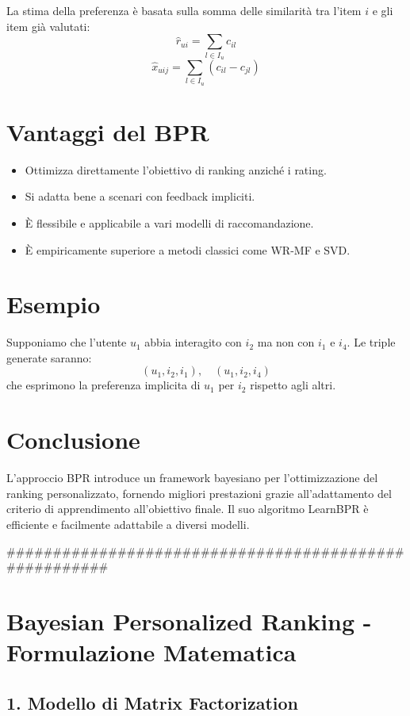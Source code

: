 \documentclass{article}
\begin{document}
La stima della preferenza è basata sulla somma delle similarità tra l’item $i$ e gli item già valutati:
\[
\hat{r}_{ui} = \sum_{l \in I_u} c_{il}
\]
\[
\hat{x}_{uij} = \sum_{l \in I_u} (c_{il} - c_{jl})
\]

\section{Vantaggi del BPR}

\begin{itemize}
    \item Ottimizza direttamente l'obiettivo di ranking anziché i rating.
    \item Si adatta bene a scenari con feedback impliciti.
    \item È flessibile e applicabile a vari modelli di raccomandazione.
    \item È empiricamente superiore a metodi classici come WR-MF e SVD.
\end{itemize}

\section{Esempio}

Supponiamo che l’utente $u_1$ abbia interagito con $i_2$ ma non con $i_1$ e $i_4$. Le triple generate saranno:
\[
(u_1, i_2, i_1), \quad (u_1, i_2, i_4)
\]
che esprimono la preferenza implicita di $u_1$ per $i_2$ rispetto agli altri.

\section{Conclusione}

L’approccio BPR introduce un framework bayesiano per l’ottimizzazione del ranking personalizzato, fornendo migliori prestazioni grazie all’adattamento del criterio di apprendimento all’obiettivo finale. Il suo algoritmo LearnBPR è efficiente e facilmente adattabile a diversi modelli.

######################################################

\section*{Bayesian Personalized Ranking - Formulazione Matematica}

\subsection*{1. Modello di Matrix Factorization}
\end{document}
